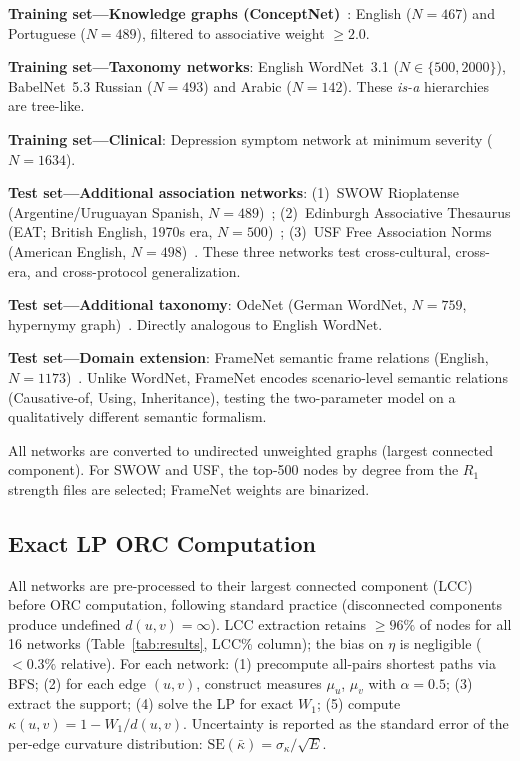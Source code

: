 \documentclass[11pt,a4paper]{article}
\newcommand{\kbar}{\bar{\kappa}}
\begin{document}
\textbf{Training set---Knowledge graphs (ConceptNet)}~\cite{speer2017conceptnet}: English ($N=467$) and Portuguese ($N=489$), filtered to associative weight $\geq 2.0$.

\textbf{Training set---Taxonomy networks}: English WordNet~3.1 ($N \in \{500, 2000\}$), BabelNet~5.3 Russian ($N=493$) and Arabic ($N=142$). These \emph{is-a} hierarchies are tree-like.

\textbf{Training set---Clinical}: Depression symptom network at minimum severity ($N=1634$).

\textbf{Test set---Additional association networks}: (1)~SWOW Rioplatense (Argentine/Uruguayan Spanish, $N=489$)~\cite{cabana2024swowrp}; (2)~Edinburgh Associative Thesaurus (EAT; British English, 1970s era, $N=500$)~\cite{kiss1973associative}; (3)~USF Free Association Norms (American English, $N=498$)~\cite{nelson1998usf}. These three networks test cross-cultural, cross-era, and cross-protocol generalization.

\textbf{Test set---Additional taxonomy}: OdeNet (German WordNet, $N=759$, hypernymy graph)~\cite{odenet2020}. Directly analogous to English WordNet.

\textbf{Test set---Domain extension}: FrameNet semantic frame relations (English, $N=1173$)~\cite{baker1998framenet}. Unlike WordNet, FrameNet encodes scenario-level semantic relations (Causative-of, Using, Inheritance), testing the two-parameter model on a qualitatively different semantic formalism.

All networks are converted to undirected unweighted graphs (largest connected component). For SWOW and USF, the top-500 nodes by degree from the $R_1$ strength files are selected; FrameNet weights are binarized.

\subsection{Exact LP ORC Computation}

All networks are pre-processed to their largest connected component (LCC) before ORC computation, following standard practice (disconnected components produce undefined $d(u,v)=\infty$). LCC extraction retains $\geq\!96\%$ of nodes for all 16 networks (Table~\ref{tab:results}, LCC\% column); the bias on $\eta$ is negligible ($<\!0.3\%$ relative). For each network: (1) precompute all-pairs shortest paths via BFS; (2) for each edge $(u,v)$, construct measures $\mu_u$, $\mu_v$ with $\alpha=0.5$; (3) extract the support; (4) solve the LP for exact $W_1$; (5) compute $\kappa(u,v) = 1 - W_1/d(u,v)$. Uncertainty is reported as the standard error of the per-edge curvature distribution: $\mathrm{SE}(\kbar) = \sigma_\kappa/\sqrt{E}$.
\end{document}

